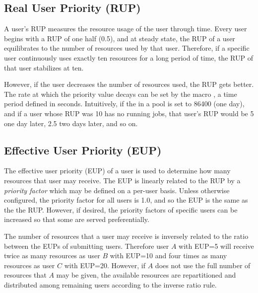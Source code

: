 \subsection{\label{sec:RUP}Real User Priority (RUP)}
A user's RUP measures the resource usage of the user 
through time.
Every user begins with a RUP of one half (0.5), and
at steady state, the RUP of a user equilibrates to the number of resources 
used by that user.  Therefore, if a specific user continuously uses exactly 
ten resources for a long period of time, the RUP of that user stabilizes at 
ten.

However, if the user decreases the number of resources used, the RUP
gets better.  The rate at which the priority value decays 
can be set by the macro , a time period 
defined in seconds.   Intuitively, if the  in a pool 
is set to 86400 (one day), and if a user whose RUP was 10 has no
running jobs, 
that user's RUP would be 5 one day later, 2.5 two days later,
and so on.

\subsection{\label{sec:EUP}Effective User Priority (EUP)}
The effective user priority (EUP) of a user is used to determine
how many resources that user may receive.
The EUP is linearly related to the RUP
by a \emph{priority factor} which may be defined on a per-user basis.
Unless otherwise configured, the priority factor for all users is 1.0,
and so the EUP is the same as the the RUP.
However, if desired, the priority factors of
specific users can be increased so that 
some are served preferentially.

The number of resources that a user may receive is inversely related
to the ratio between the EUPs of submitting users.
Therefore user $A$ with EUP=5 will receive
twice as many resources as user $B$ with EUP=10 and four times as many 
resources as user $C$ with EUP=20.
However, if $A$ does not use the full number
of resources that $A$ may be given,
the available resources are repartitioned and distributed among
remaining users according to the inverse ratio rule.

